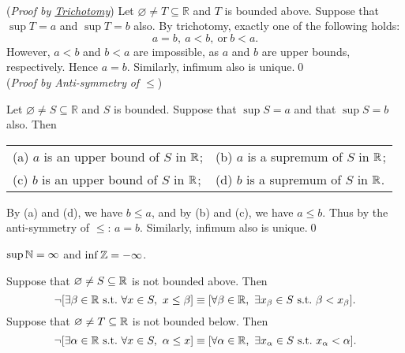 \documentclass[11pt,openany]{article}
\begin{document}
\begin{remark*}
	\ \vspace{12pt} \\
	(\textit{Proof by \hyperlink{trichotomy}{Trichotomy}}) Let $\varnothing\neq T\subseteq\mathbb{R}$ and $T$ is bounded above. Suppose that $\sup T=a$ and $\sup T=b$ also. By trichotomy, exactly one of the following holds: \[
	a=b,\ a<b,\ \text{or}\ b<a.  
	\] However, $a<b$ and $b<a$ are impossible, as $a$ and $b$ are upper bounds, respectively. Hence $a=b$. Similarly, infimum also is unique.\qed\vspace{12pt} \\
	(\textit{Proof by Anti-symmetry}\footnotemark[3]\textit{ of $\leq$})
	\addtocounter{footnote}{1}
	Let $\varnothing\neq S\subseteq\mathbb{R}$ and $S$ is bounded. Suppose that $\sup S=a$ and that $\sup S=b$ also. Then \begin{center}
		\begin{tabular*}{\textwidth}{ll}
			(a) $a$ is an upper bound of $S$ in $\mathbb{R}$;
			& (b) $a$ is a supremum of $S$ in $\mathbb{R}$; \\
			(c) $b$ is an upper bound of $S$ in $\mathbb{R}$;
			& (d) $b$ is a supremum of $S$ in $\mathbb{R}$.
		\end{tabular*}
	\end{center} By (a) and (d), we have $b\leq a$, and by (b) and (c), we have $a\leq b$. Thus by the anti-symmetry of $\leq$: $a=b$. Similarly, infimum also is unique.\qed
\end{remark*}
\vfill
{}
\begin{example*}
	$\sup \mathbb{N}=\infty$ and $\inf\mathbb{Z}=-\infty$.
\end{example*}
\begin{remark*}
	Suppose that $\varnothing\neq S\subseteq\mathbb{R}$ is not bounded above. Then \[
	\lnot[\exists\beta\in\R\ \text{s.t.}\ \forall x\in S,\ x\leq\beta]\equiv[\forall\beta\in\R,\ \exists x_{\beta}\in S\ \text{s.t.}\ \beta <x_\beta].
	\] Suppose that $\varnothing\neq T\subseteq\mathbb{R}$ is not bounded below. Then \[
	\lnot[\exists\alpha\in\R\ \text{s.t.}\ \forall x\in S,\ \alpha\leq x]\equiv[\forall\alpha\in\R,\ \exists x_{\alpha}\in S\ \text{s.t.}\ x_\alpha < \alpha].
	\]
\end{remark*}
\end{document}
